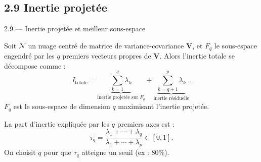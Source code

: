 \subsection{2.9 Inertie projetée}
\begin{frame}{2.9 — Inertie projetée et meilleur sous-espace}
\begin{theorem}
Soit $\mathcal{N}$ un nuage centré de matrice de variance-covariance $\mathbf{V}$,
et $F_q$ le sous-espace engendré par les $q$ premiers vecteurs propres de $\mathbf{V}$.
Alors l'inertie totale se décompose comme :
\[
\boxed{\;
I_{\text{totale}}
= \underbrace{\sum_{k=1}^q \lambda_k}_{\text{inertie projetée sur } F_q}
+ \underbrace{\sum_{k=q+1}^p \lambda_k}_{\text{inertie résiduelle}}.
\;}
\]
$F_q$ est le sous-espace de dimension $q$ \alert{maximisant} l'inertie projetée.
\end{theorem}

\begin{prop}
La part d'inertie expliquée par les $q$ premiers axes est :
\[
\tau_q = \frac{\lambda_1 + \cdots + \lambda_q}{\lambda_1 + \cdots + \lambda_p} \in [0, 1].
\]
On choisit $q$ pour que $\tau_q$ atteigne un seuil (ex : 80\%).
\end{prop}
\end{frame}


